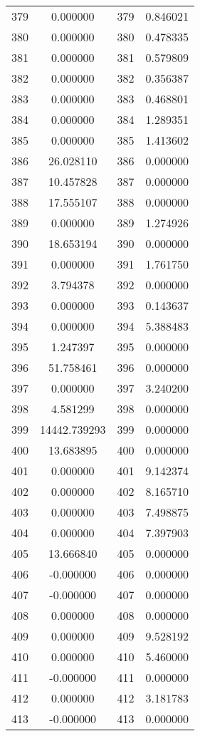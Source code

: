 \documentclass[12pt]{article}
\begin{document}
\begin{longtable}{@{}cccc@{}}
379 & 0.000000 & 379 & 0.846021 \\
380 & 0.000000 & 380 & 0.478335 \\
381 & 0.000000 & 381 & 0.579809 \\
382 & 0.000000 & 382 & 0.356387 \\
383 & 0.000000 & 383 & 0.468801 \\
384 & 0.000000 & 384 & 1.289351 \\
385 & 0.000000 & 385 & 1.413602 \\
386 & 26.028110 & 386 & 0.000000 \\
387 & 10.457828 & 387 & 0.000000 \\
388 & 17.555107 & 388 & 0.000000 \\
389 & 0.000000 & 389 & 1.274926 \\
390 & 18.653194 & 390 & 0.000000 \\
391 & 0.000000 & 391 & 1.761750 \\
392 & 3.794378 & 392 & 0.000000 \\
393 & 0.000000 & 393 & 0.143637 \\
394 & 0.000000 & 394 & 5.388483 \\
395 & 1.247397 & 395 & 0.000000 \\
396 & 51.758461 & 396 & 0.000000 \\
397 & 0.000000 & 397 & 3.240200 \\
398 & 4.581299 & 398 & 0.000000 \\
399 & 14442.739293 & 399 & 0.000000 \\
400 & 13.683895 & 400 & 0.000000 \\
401 & 0.000000 & 401 & 9.142374 \\
402 & 0.000000 & 402 & 8.165710 \\
403 & 0.000000 & 403 & 7.498875 \\
404 & 0.000000 & 404 & 7.397903 \\
405 & 13.666840 & 405 & 0.000000 \\
406 & -0.000000 & 406 & 0.000000 \\
407 & -0.000000 & 407 & 0.000000 \\
408 & 0.000000 & 408 & 0.000000 \\
409 & 0.000000 & 409 & 9.528192 \\
410 & 0.000000 & 410 & 5.460000 \\
411 & -0.000000 & 411 & 0.000000 \\
412 & 0.000000 & 412 & 3.181783 \\
413 & -0.000000 & 413 & 0.000000 \\

\end{longtable}
\end{document}
